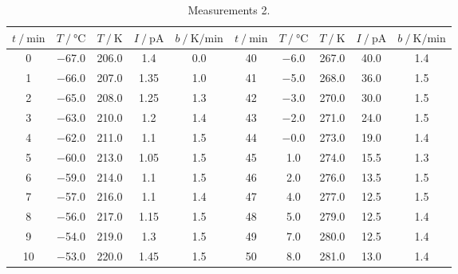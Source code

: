  \begin{table}
    \centering
    \caption{Measurements 2.}
    \label{tab:measurements_2}
    \begin{tabular}{S S S S S | S S S S S}
      \toprule
      {$t \mathbin{/} \unit{\minute}$} & {$T \mathbin{/} \unit{\celsius}$} & {$T \mathbin{/} \unit{\kelvin}$} &%
      {$I \mathbin{/} \unit{\pico\ampere}$} & {$b \mathbin{/} \unit{\kelvin\per\minute}$} & {$t \mathbin{/} \unit{\minute}$} &%
      {$T \mathbin{/} \unit{\celsius}$} & {$T \mathbin{/} \unit{\kelvin}$} & {$I \mathbin{/} \unit{\pico\ampere}$} &%
      {$b \mathbin{/} \unit{\kelvin\per\minute}$}\\
      \midrule
      \num{ 0} &  \num{-67.0} &  \num{206.0} &  \num{ 1.4 } &  \num{0.0} & \num{40} &  \num{ -6.0} &  \num{267.0} &  \num{40.0 } &  \num{1.4} \\
      \num{ 1} &  \num{-66.0} &  \num{207.0} &  \num{ 1.35} &  \num{1.0} & \num{41} &  \num{ -5.0} &  \num{268.0} &  \num{36.0 } &  \num{1.5} \\
      \num{ 2} &  \num{-65.0} &  \num{208.0} &  \num{ 1.25} &  \num{1.3} & \num{42} &  \num{ -3.0} &  \num{270.0} &  \num{30.0 } &  \num{1.5} \\ 
      \num{ 3} &  \num{-63.0} &  \num{210.0} &  \num{ 1.2 } &  \num{1.4} & \num{43} &  \num{ -2.0} &  \num{271.0} &  \num{24.0 } &  \num{1.5} \\ 
      \num{ 4} &  \num{-62.0} &  \num{211.0} &  \num{ 1.1 } &  \num{1.5} & \num{44} &  \num{ -0.0} &  \num{273.0} &  \num{19.0 } &  \num{1.4} \\ 
      \num{ 5} &  \num{-60.0} &  \num{213.0} &  \num{ 1.05} &  \num{1.5} & \num{45} &  \num{  1.0} &  \num{274.0} &  \num{15.5 } &  \num{1.3} \\ 
      \num{ 6} &  \num{-59.0} &  \num{214.0} &  \num{ 1.1 } &  \num{1.5} & \num{46} &  \num{  2.0} &  \num{276.0} &  \num{13.5 } &  \num{1.5} \\ 
      \num{ 7} &  \num{-57.0} &  \num{216.0} &  \num{ 1.1 } &  \num{1.4} & \num{47} &  \num{  4.0} &  \num{277.0} &  \num{12.5 } &  \num{1.5} \\ 
      \num{ 8} &  \num{-56.0} &  \num{217.0} &  \num{ 1.15} &  \num{1.5} & \num{48} &  \num{  5.0} &  \num{279.0} &  \num{12.5 } &  \num{1.4} \\ 
      \num{ 9} &  \num{-54.0} &  \num{219.0} &  \num{ 1.3 } &  \num{1.5} & \num{49} &  \num{  7.0} &  \num{280.0} &  \num{12.5 } &  \num{1.4} \\ 
      \num{10} &  \num{-53.0} &  \num{220.0} &  \num{ 1.45} &  \num{1.5} & \num{50} &  \num{  8.0} &  \num{281.0} &  \num{13.0 } &  \num{1.4} \\ 

\end{tabular}
\end{table}
